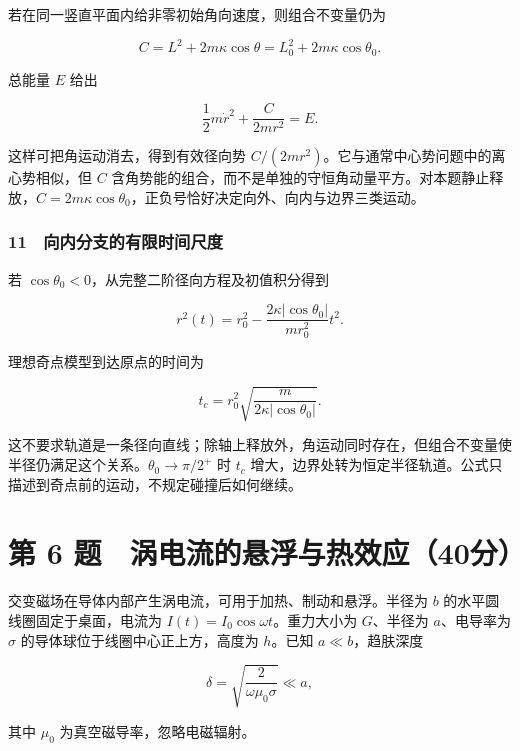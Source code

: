\documentclass[12pt,a4paper,fontset=fandol]{ctexart}
\begin{document}
若在同一竖直平面内给非零初始角向速度，则组合不变量仍为

\[C=L^2+2m\kappa\cos\theta
=L_0^2+2m\kappa\cos\theta_0.\]

总能量 \(E\) 给出

\[\frac12m\dot r^2+\frac{C}{2mr^2}=E.\]

这样可把角运动消去，得到有效径向势
\(C/(2mr^2)\)。它与通常中心势问题中的离心势相似，但 \(C\)
含角势能的组合，而不是单独的守恒角动量平方。对本题静止释放，\(C=2m\kappa\cos\theta_0\)，正负号恰好决定向外、向内与边界三类运动。

\subsubsection{11　向内分支的有限时间尺度}\label{ux5411ux5185ux5206ux652fux7684ux6709ux9650ux65f6ux95f4ux5c3aux5ea6}

若 \(\cos\theta_0<0\)，从完整二阶径向方程及初值积分得到

\[r^2(t)=r_0^2-
\frac{2\kappa|\cos\theta_0|}{mr_0^2}t^2.\]

理想奇点模型到达原点的时间为

\[t_c=r_0^2\sqrt{\frac{m}{2\kappa|\cos\theta_0|}}.\]

这不要求轨道是一条径向直线；除轴上释放外，角运动同时存在，但组合不变量使半径仍满足这个关系。\(\theta_0\to\pi/2^+\)
时 \(t_c\)
增大，边界处转为恒定半径轨道。公式只描述到奇点前的运动，不规定碰撞后如何继续。

\clearpage

\section{第 6
题　涡电流的悬浮与热效应（40分）}\label{ux7b2c-6-ux9898-ux6da1ux7535ux6d41ux7684ux60acux6d6eux4e0eux70edux6548ux5e9440ux5206}

交变磁场在导体内部产生涡电流，可用于加热、制动和悬浮。半径为 \(b\)
的水平圆线圈固定于桌面，电流为 \(I(t)=I_0\cos\omega t\)。重力大小为
\(G\)、半径为 \(a\)、电导率为 \(\sigma\)
的导体球位于线圈中心正上方，高度为 \(h\)。已知 \(a\ll b\)，趋肤深度

\[\delta=\sqrt{\frac2{\omega\mu_0\sigma}}\ll a,\]

其中 \(\mu_0\) 为真空磁导率，忽略电磁辐射。
\end{document}
